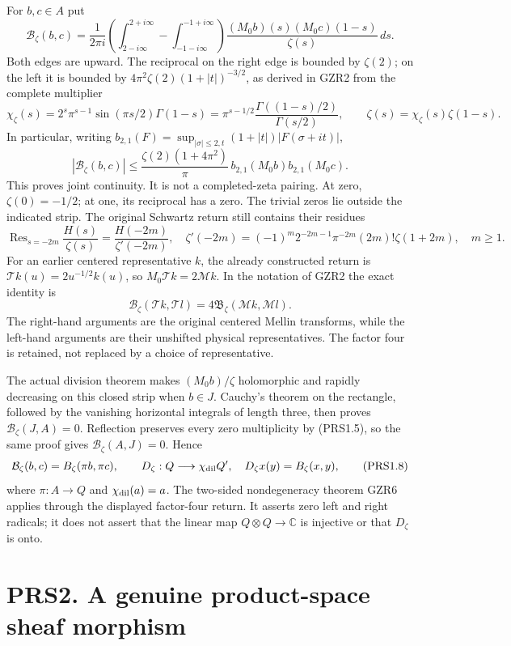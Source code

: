 For \(b,c\in A\) put \[
\mathcal B_\zeta(b,c)=\frac1{2\pi i}
\left(\int_{2-i\infty}^{2+i\infty}-\int_{-1-i\infty}^{-1+i\infty}\right)
\frac{(M_0b)(s)(M_0c)(1-s)}{\zeta(s)}\,ds.
\tag{PRS1.4}
\] Both edges are upward. The reciprocal on the right edge is bounded by
\(\zeta(2)\); on the left it is bounded by
\(4\pi^2\zeta(2)(1+|t|)^{-3/2}\), as derived in GZR2 from the complete
multiplier \[
\chi_\zeta(s)=2^s\pi^{s-1}\sin(\pi s/2)\Gamma(1-s)
=\pi^{s-1/2}\frac{\Gamma((1-s)/2)}{\Gamma(s/2)},\qquad
\zeta(s)=\chi_\zeta(s)\zeta(1-s).
\tag{PRS1.5}
\] In particular, writing
\(b_{2,1}(F)=\sup_{|\sigma|\leq2,t}(1+|t|)|F(\sigma+it)|\), \[
|\mathcal B_\zeta(b,c)|\leq
\frac{\zeta(2)(1+4\pi^2)}{\pi}\,b_{2,1}(M_0b)b_{2,1}(M_0c).
\tag{PRS1.6}
\] This proves joint continuity. It is not a completed-zeta pairing. At
zero, \(\zeta(0)=-1/2\); at one, its reciprocal has a zero. The trivial
zeros lie outside the indicated strip. The original Schwartz return
still contains their residues \[
\operatorname{Res}_{s=-2m}\frac{H(s)}{\zeta(s)}=\frac{H(-2m)}{\zeta'(-2m)},\quad
\zeta'(-2m)=(-1)^m2^{-2m-1}\pi^{-2m}(2m)!\zeta(1+2m),\quad m\geq1.
\tag{PRS1.7}
\] For an earlier centered representative \(k\), the already constructed
return is \(\mathcal Tk(u)=2u^{-1/2}k(u)\), so
\(M_0\mathcal Tk=2\mathcal Mk\). In the notation of GZR2 the exact
identity is \[
\mathcal B_\zeta(\mathcal Tk,\mathcal Tl)=4\mathfrak B_\zeta(\mathcal Mk,\mathcal Ml).
\] The right-hand arguments are the original centered Mellin transforms,
while the left-hand arguments are their unshifted physical
representatives. The factor four is retained, not replaced by a choice
of representative.

The actual division theorem makes \((M_0b)/\zeta\) holomorphic and
rapidly decreasing on this closed strip when \(b\in J\). Cauchy's
theorem on the rectangle, followed by the vanishing horizontal integrals
of length three, then proves \(\mathcal B_\zeta(J,A)=0\). Reflection
preserves every zero multiplicity by (PRS1.5), so the same proof gives
\(\mathcal B_\zeta(A,J)=0\). Hence \[
\mathcal B_\zeta(b,c)=B_\zeta(\pi b,\pi c),\qquad
D_\zeta:Q\longrightarrow\chi_{\rm dil}Q',\quad D_\zeta x(y)=B_\zeta(x,y),
\tag{PRS1.8}
\] where \(\pi:A\to Q\) and \(\chi_{\rm dil}(a)=a\). The two-sided
nondegeneracy theorem GZR6 applies through the displayed factor-four
return. It asserts zero left and right radicals; it does not assert that
the linear map \(Q\otimes Q\to\mathbb C\) is injective or that
\(D_\zeta\) is onto.

\section{PRS2. A genuine product-space sheaf
morphism}\label{prs2.-a-genuine-product-space-sheaf-morphism}

